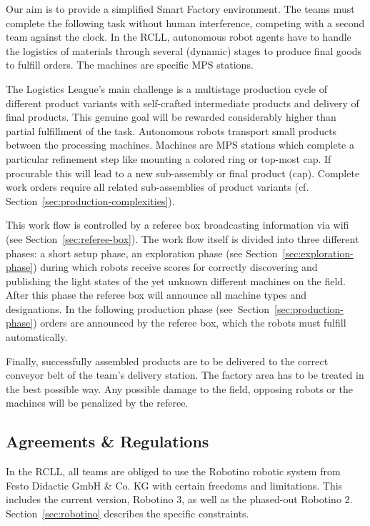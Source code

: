 \documentclass[12pt,twoside]{article}
\newcommand{\refsec}[1]{Section~\ref{#1}}
\begin{document}
Our aim is to provide a simplified Smart Factory environment. The
teams must complete the following task without human interference,
competing with a second team against the clock. In the RCLL,
autonomous robot agents have to handle the logistics of materials
through several (dynamic) stages to produce final goods to fulfill
orders. The machines are specific MPS stations.

The Logistics League's main challenge is a multistage production cycle
of different product variants with self-crafted intermediate products
and delivery of final products. This genuine goal will be rewarded
considerably higher than partial fulfillment of the task. Autonomous
robots transport small products between the processing
machines. Machines are MPS stations which complete a particular
refinement step like mounting a colored ring or top-most cap. If
procurable this will lead to a new sub-assembly or final product
(cap). Complete work orders require all related sub-assemblies of
product variants (cf. \refsec{sec:production-complexities}).

This work flow is controlled by a referee box broadcasting information
via wifi (see \refsec{sec:referee-box}). The work flow itself is
divided into three different phases: a short setup phase, an
exploration phase (see \refsec{sec:exploration-phase}) during which
robots receive scores for correctly discovering and publishing the light 
states of the yet unknown different machines 
on the field. After this phase the referee box will announce all machine 
types and designations. In the following production phase 
(see~\refsec{sec:production-phase}) orders are announced by the referee 
box, which the robots must fulfill automatically.

Finally, 
successfully assembled products are to be delivered to the correct
conveyor belt of the team's delivery station. The factory
area has to be treated in the best possible way. Any possible damage
to the field, opposing robots or the machines will be penalized by the
referee.

\subsection{Agreements \& Regulations}
\label{sec:agreements}
In the RCLL, all teams are obliged to use the Robotino robotic system
from Festo Didactic GmbH \& Co. KG with certain freedoms and
limitations. This includes the current version, Robotino 3, as well as
the phased-out Robotino 2. \refsec{sec:robotino} describes the
specific constraints.
\end{document}
